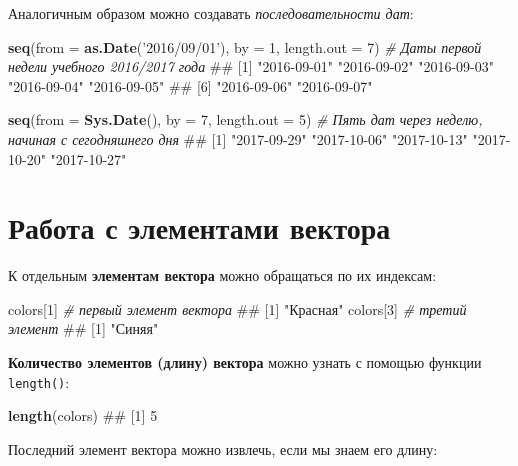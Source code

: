 \documentclass[]{book}
\newenvironment{Shaded}{\begin{snugshade}}{\end{snugshade}}
\newcommand{\KeywordTok}[1]{\textcolor[rgb]{0.13,0.29,0.53}{\textbf{#1}}}
\newcommand{\DataTypeTok}[1]{\textcolor[rgb]{0.13,0.29,0.53}{#1}}
\newcommand{\DecValTok}[1]{\textcolor[rgb]{0.00,0.00,0.81}{#1}}
\newcommand{\StringTok}[1]{\textcolor[rgb]{0.31,0.60,0.02}{#1}}
\newcommand{\CommentTok}[1]{\textcolor[rgb]{0.56,0.35,0.01}{\textit{#1}}}
\newcommand{\NormalTok}[1]{#1}
\begin{document}
Аналогичным образом можно создавать \emph{последовательности дат}:

\begin{Shaded}
\begin{Highlighting}[]
\KeywordTok{seq}\NormalTok{(}\DataTypeTok{from =} \KeywordTok{as.Date}\NormalTok{(}\StringTok{'2016/09/01'}\NormalTok{), }\DataTypeTok{by =} \DecValTok{1}\NormalTok{, }\DataTypeTok{length.out =} \DecValTok{7}\NormalTok{) }\CommentTok{# Даты первой недели учебного 2016/2017 года}
\NormalTok{## [1] "2016-09-01" "2016-09-02" "2016-09-03" "2016-09-04" "2016-09-05"}
\NormalTok{## [6] "2016-09-06" "2016-09-07"}

\KeywordTok{seq}\NormalTok{(}\DataTypeTok{from =} \KeywordTok{Sys.Date}\NormalTok{(), }\DataTypeTok{by =} \DecValTok{7}\NormalTok{, }\DataTypeTok{length.out =} \DecValTok{5}\NormalTok{) }\CommentTok{# Пять дат через неделю, начиная с сегодняшнего дня}
\NormalTok{## [1] "2017-09-29" "2017-10-06" "2017-10-13" "2017-10-20" "2017-10-27"}
\end{Highlighting}
\end{Shaded}

\section{Работа с элементами вектора}\label{vector_elements}

К отдельным \textbf{элементам вектора} можно обращаться по их индексам:

\begin{Shaded}
\begin{Highlighting}[]
\NormalTok{colors[}\DecValTok{1}\NormalTok{] }\CommentTok{# первый элемент вектора}
\NormalTok{## [1] "Красная"}
\NormalTok{colors[}\DecValTok{3}\NormalTok{] }\CommentTok{# третий элемент}
\NormalTok{## [1] "Синяя"}
\end{Highlighting}
\end{Shaded}

\textbf{Количество элементов (длину) вектора} можно узнать с помощью
функции \texttt{length()}:

\begin{Shaded}
\begin{Highlighting}[]
\KeywordTok{length}\NormalTok{(colors)}
\NormalTok{## [1] 5}
\end{Highlighting}
\end{Shaded}

Последний элемент вектора можно извлечь, если мы знаем его длину:
\end{document}
